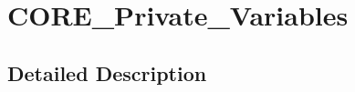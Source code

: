 \hypertarget{group___c_o_r_e___private___variables}{}\section{C\+O\+R\+E\+\_\+\+Private\+\_\+\+Variables}
\label{group___c_o_r_e___private___variables}


\subsection{Detailed Description}
